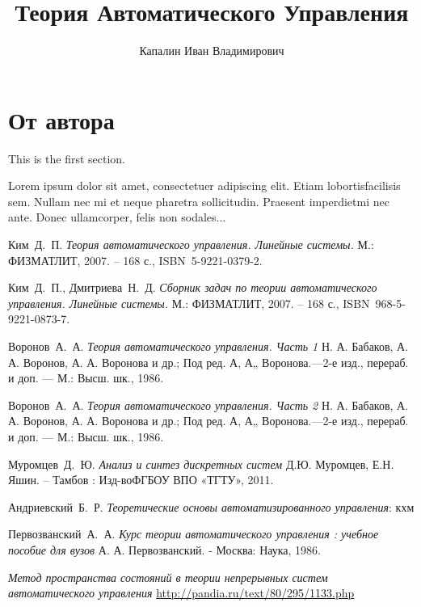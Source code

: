 \documentclass[openany,%
twoside,%
a5paper,%
9pt]{extbook}
\title{Теория Автоматического Управления}
\author{Капалин Иван Владимирович}
\date{}
\theoremstyle{plain}
\theoremstyle{definition}
\theoremstyle{remark}
\theoremstyle{plain}
\begin{document}
\maketitle

\tableofcontents

\chapter*{От автора}

    This is the first section.
     
    Lorem  ipsum  dolor  sit  amet,  consectetuer  adipiscing  
    elit.   Etiam  lobortisfacilisis sem.  Nullam nec mi et 
    neque pharetra sollicitudin.  Praesent imperdietmi nec ante. 
    Donec ullamcorper, felis non sodales...







\begin{thebibliography}{0}

     Ким~Д.~П.
    \emph{Теория автоматического управления. Линейные системы.} М.: ФИЗМАТЛИТ, 2007. – 168 с., ISBN~5-9221-0379-2.

     Ким~Д.~П., Дмитриева~Н.~Д.
    \emph{Сборник задач по теории автоматического управления. Линейные системы.} М.: ФИЗМАТЛИТ, 2007. – 168 с., ISBN~968-5-9221-0873-7.

     Воронов~А.~А.
    \emph{Теория автоматического управления. Часть 1} Н. А. Бабаков, А. А. Воронов, А. А. Воронова и др.; Под ред. А, А„ Воронова.—2-е изд., перераб. и доп. — М.: Высш. шк., 1986.

     Воронов~А.~А.
    \emph{Теория автоматического управления. Часть 2} Н. А. Бабаков, А. А. Воронов, А. А. Воронова и др.; Под ред. А, А„ Воронова.—2-е изд., перераб. и доп. — М.: Высш. шк., 1986.

     Муромцев~Д.~Ю.
    \emph{Анализ и синтез дискретных систем} Д.Ю. Муромцев, Е.Н. Яшин. – Тамбов : Изд-воФГБОУ ВПО «ТГТУ», 2011.

     Андриевский~Б.~Р.
    \emph{Теоретические основы автоматизированного управления}: кхм

     Первозванский~А.~А.
    \emph{Курс теории автоматического управления : учебное пособие для вузов} А. А. Первозванский. - Москва: Наука, 1986.

    \emph{Метод пространства состояний в теории непрерывных систем автоматического управления} \url{http://pandia.ru/text/80/295/1133.php}

\end{thebibliography}
\end{document}
